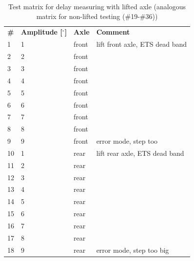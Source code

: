 \documentclass[ExampleMasters.tex]{subfiles}
\begin{document}
	\begin{table}[h]
		
		\centering
		\begin{tabular}{llll}
			\textbf{\#} & \textbf{Amplitude [$  ^\circ $]} & \textbf{Axle}  & \textbf{Comment}                                                                  \\
			1  & 1                & front & lift front axle, \gls{ETS} dead band \\
			2  & 2                & front &                                                                          \\
			3  & 3                & front &                                                                          \\
			4  & 4                & front &                                                                          \\
			5  & 5                & front &                                                                          \\
			6  & 6                & front &                                                                          \\
			7  & 7                & front &                                                                          \\
			8  & 8                & front &                                                                          \\
			9  & 9                & front & error mode, step too\footnotemark[1]                                      \\\hline
			10 & 1                & rear  & lift rear axle, \gls{ETS} dead band  \\
			11 & 2                & rear &                                                                          \\
			12 & 3                & rear &                                                                          \\
			13 & 4                & rear &                                                                          \\
			14 & 5                & rear &                                                                          \\
			15 & 6                & rear &                                                                          \\
			16 & 7                & rear &                                                                          \\
			17 & 8                & rear &                                                                          \\
			18 & 9                & rear & error mode, step too big\footnotemark[1]                                                                   \\
			
		\end{tabular}
		\caption{Test matrix for delay measuring with lifted axle (analogous matrix for non-lifted testing (\#19-\#36))}
		\label{tab:test_matrx_delay_measuring}
	\end{table}
\end{document}

